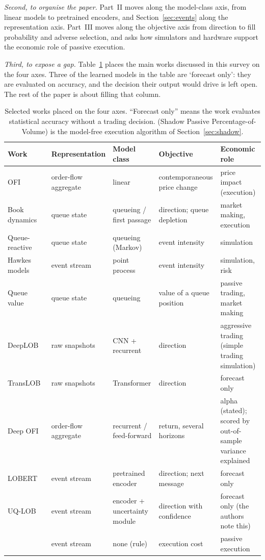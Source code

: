 \emph{Second, to organise the paper.} Part~II moves along the model-class axis, from linear models
to pretrained encoders, and Section~\ref{sec:events} along the representation axis. Part~III moves
along the objective axis from direction to fill probability and adverse selection, and asks how
simulators and hardware support the economic role of passive execution.

\emph{Third, to expose a gap.} Table~\ref{tab:axes} places the main works discussed in this survey
on the four axes. Three of the learned models in the table are `forecast only': they
are evaluated on accuracy, and the decision their output would drive is left open. The rest of the paper is about filling that column.

\begin{table}[!htbp]
\centering\footnotesize
\caption{Selected works placed on the four axes. ``Forecast only'' means the work evaluates
statistical accuracy without a trading decision. \pov{} (Shadow Passive
Percentage-of-Volume) is the model-free execution algorithm of Section~\ref{sec:shadow}.}
\label{tab:axes}
\setlength{\tabcolsep}{2pt}
\begin{tabularx}{\linewidth}{l*{4}{>{\raggedright\arraybackslash}X}}
\toprule
Work & Representation & Model class & Objective & Economic role \\
\midrule
OFI~\citep{cks2014} & order-flow aggregate & linear & contemporaneous price change & price impact (execution) \\
Book dynamics~\citep{cst2010} & queue state & queueing / first passage & direction; queue depletion & market making, execution \\
Queue-reactive~\citep{huang2015} & queue state & queueing (Markov) & event intensity & simulation \\
Hawkes models~\citep{bacry2015} & event stream & point process & event intensity & simulation, risk \\
Queue value~\citep{moallemi2017} & queue state & queueing & value of a queue position & passive trading, market making \\
DeepLOB~\citep{zhang2019} & raw snapshots & CNN + recurrent & direction & aggressive trading (simple trading simulation) \\
TransLOB~\citep{wallbridge2020} & raw snapshots & Transformer & direction & forecast only \\
Deep OFI~\citep{kolm2023} & order-flow aggregate & recurrent / feed-forward & return, several horizons & alpha (stated); scored by out-of-sample variance explained \\
LOBERT~\citep{linna2025lobert} & event stream & pretrained encoder & direction; next message & forecast only \\
UQ-LOB~\citep{manoharan2026uqlob} & event stream & encoder + uncertainty module & direction with confidence & forecast only (the authors note this) \\
\pov{}~\citep{maciejewski_shadow} & event stream & none (rule) & execution cost & passive execution \\
\bottomrule
\end{tabularx}
\end{table}

